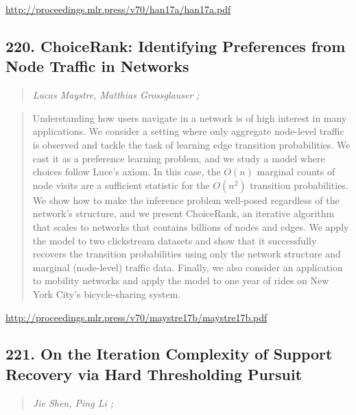 \documentclass{article}
\begin{document}
\href{http://proceedings.mlr.press/v70/han17a/han17a.pdf}{http://proceedings.mlr.press/v70/han17a/han17a.pdf}

\subsection{220. ChoiceRank: Identifying Preferences from Node Traffic in Networks}

\begin{quote}
\footnotesize{\textit{Lucas Maystre, Matthias Grossglauser ;}}

\end{quote}

\begin{quote}
    Understanding how users navigate in a network is of high interest in many applications. We consider a setting where only aggregate node-level traffic is observed and tackle the task of learning edge transition probabilities. We cast it as a preference learning problem, and we study a model where choices follow Luce’s axiom. In this case, the $O(n)$ marginal counts of node visits are a sufficient statistic for the $O(n^2)$ transition probabilities. We show how to make the inference problem well-posed regardless of the network’s structure, and we present ChoiceRank, an iterative algorithm that scales to networks that contains billions of nodes and edges. We apply the model to two clickstream datasets and show that it successfully recovers the transition probabilities using only the network structure and marginal (node-level) traffic data. Finally, we also consider an application to mobility networks and apply the model to one year of rides on New York City’s bicycle-sharing system.  
\end{quote}

\href{http://proceedings.mlr.press/v70/maystre17b/maystre17b.pdf}{http://proceedings.mlr.press/v70/maystre17b/maystre17b.pdf}

\subsection{221. On the Iteration Complexity of Support Recovery via Hard Thresholding Pursuit}

\begin{quote}
\footnotesize{\textit{Jie Shen, Ping Li ;}}

\end{quote}
\end{document}
